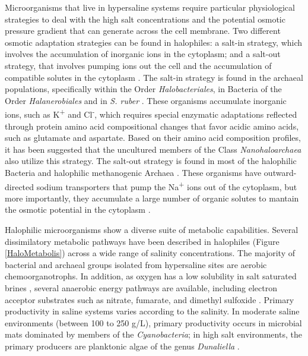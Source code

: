 Microorganisms that live in hypersaline systems require particular physiological strategies to deal with the high salt concentrations and the potential osmotic pressure gradient that can generate across the cell membrane. Two different osmotic adaptation strategies can be found in halophiles: a salt-in strategy, which involves the accumulation of inorganic ions in the cytoplasm; and a salt-out strategy, that involves pumping ions out the cell and the accumulation of compatible solutes in the cytoplasm \cite{Oren:2013bc}. The salt-in strategy is found in the archaeal populations, specifically within the Order \textit{Halobacteriales}, in Bacteria of the Order \textit{Halanerobiales} and in \textit{S. ruber} \cite{Oren:2013bc}. These organisms accumulate inorganic ions, such as K\textsuperscript{+} and Cl\textsuperscript{-}, which requires special enzymatic adaptations reﬂected through protein amino acid compositional changes that favor acidic amino acids, such as glutamate and aspartate. Based on their amino acid composition profiles, it has been suggested that the uncultured members of the Class \textit{Nanohaloarchaea} also utilize this strategy. The salt-out strategy is found in most of the halophilic Bacteria and halophilic methanogenic Archaea  \cite{Oren:2013bc}. These organisms have outward-directed sodium transporters that pump the Na\textsuperscript{+} ions out of the cytoplasm, but more importantly, they accumulate a large number of organic solutes to mantain the osmotic potential in the cytoplasm \cite{Oren:2013bc}.

Halophilic microorganisms show a diverse suite of metabolic capabilities. Several dissimilatory metabolic pathways have been described in halophiles (Figure \ref{HaloMetabolis}) across a wide range of salinity concentrations. The majority of bacterial and archaeal groups isolated from hypersaline sites are aerobic chemoorganotrophs. In addition, as oxygen has a low solubility in salt saturated brines \cite{Sherwood:1991tg}, several anaerobic energy pathways are available, including electron acceptor substrates such as nitrate, fumarate, and dimethyl sulfoxide \cite{Oren:2008ej,Oren:2013bc}. Primary productivity in saline systems varies according to the salinity. In moderate saline environments (between 100 to 250 g/L), primary productivity occurs in microbial mats dominated by members of the \textit{Cyanobacteria};  in high salt environments, the primary producers are planktonic algae of the genus \textit{Dunaliella} \cite{Oren:2009el}.


